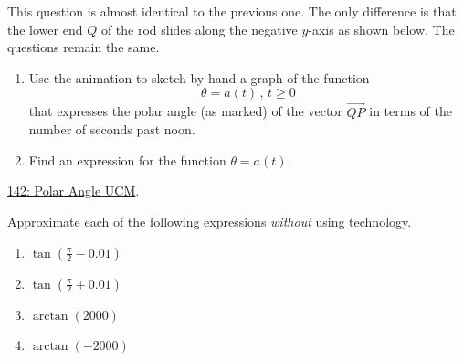\documentclass{ximera}
\begin{document}
\begin{question} \label{QPODferFDRE}

This question is almost identical to the previous one. The only difference is that the lower end $Q$ of the rod slides along the negative $y$-axis as shown below. The questions remain the same. 

\begin{enumerate}

\item Use the animation to sketch by hand a graph of the function
\[
    \theta = a(t) \, , \, t\geq 0
\]
that expresses the polar angle (as marked) of the vector $\overrightarrow{QP}$ in terms of the number of seconds past noon.

\item Find an expression for the function $\theta = a(t)$.

\end{enumerate}

\href{https://www.desmos.com/calculator/jcyu1r8vwn}{142: Polar Angle UCM}.

 
\begin{onlineOnly}
    \begin{center}
\end{center}
\end{onlineOnly}


\end{question}


\begin{question} \label{Q45rghREERwer}
Approximate each of the following expressions \emph{without} using technology.
\begin{enumerate}
\item $\tan \left(\frac{\pi}{2} - 0.01\right)$

\item $\tan \left(\frac{\pi}{2} + 0.01 \right)$

\item $\arctan(2000)$

\item $\arctan(-2000)$
\end{enumerate}

\end{question}
\end{document}

